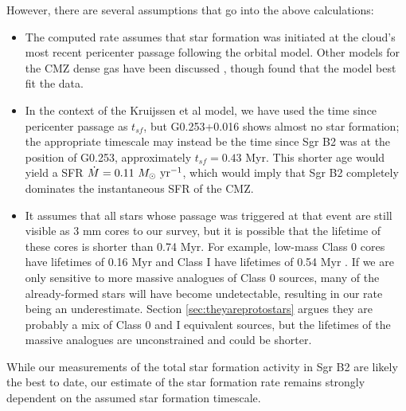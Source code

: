 \documentclass[twocolumn]{aastex61}
\begin{document}
However, there are several assumptions that go into the above calculations:
\begin{itemize}
    \item The computed rate assumes that star formation was initiated at the
        cloud's most recent pericenter passage following the
        \citet{Kruijssen2015a} orbital model.  Other models for the CMZ
        dense gas have been discussed
        \citep[e.g.,][]{Molinari2011a,Sofue2017b,Ridley2017a,Sormani2017a},
        though \citet{Henshaw2016a} found that the \citet{Kruijssen2015a} model
        best fit the data.
    \item In the context of the Kruijssen et al model, we have used the time
        since pericenter passage as $t_{sf}$, but G0.253+0.016 shows almost no
        star formation; the appropriate timescale may instead be the time since
        Sgr B2 was at the position of G0.253, approximately $t_{sf}=0.43$ Myr.
        This shorter age would yield a SFR
        ${\dot{M}=0.11~M_{\odot}~\textrm{yr}^{-1}}$, which would imply that Sgr
        B2 completely dominates the instantaneous SFR of the CMZ.
    \item It  assumes that all stars whose passage was triggered at that event
        are still visible as 3 mm cores to our survey, but it is possible that
        the lifetime of these cores is shorter than 0.74 Myr.  For example,
        low-mass Class 0 cores have lifetimes of 0.16 Myr and Class I have
        lifetimes of 0.54 Myr \citep{Evans2009a}.  If we are only sensitive to 
        more massive analogues of Class 0 sources, many of the already-formed
        stars will have become undetectable, resulting in our rate being
        an underestimate.  Section \ref{sec:theyareprotostars} argues
        they are probably a mix of Class 0 and I equivalent sources,
        but the lifetimes of the massive analogues are unconstrained
        and could be shorter.
\end{itemize}

While our measurements of the total star formation activity in Sgr B2 are
likely the best to date, our estimate of the star formation rate remains
strongly dependent on the assumed star formation timescale.


% 
\end{document}
